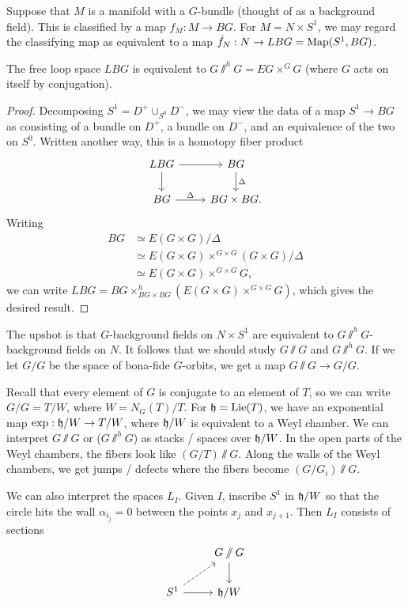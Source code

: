 Suppose that $M$ is a manifold with a $G$-bundle (thought of as a background field).
This is classified by a map $f_M: M \to BG$.
For $M = N \times S^1$, we may regard the classifying map as equivalent to a map $\hat{f}_N: N \to LBG = \operatorname{Map}(S^1, BG)$.

\begin{prop}
	The free loop space $LBG$ is equivalent to $G \sslash^h G = EG \times^G G$ (where $G$ acts on itself by conjugation).
\end{prop}

\begin{proof}
	Decomposing $S^1 = D^+ \cup_{S^0} D^-$, we may view the data of a map $S^1 \to BG$ as consisting of a bundle on $D^+$, a bundle on $D^-$, and an equivalence of the two on $S^0$.
	Written another way, this is a homotopy fiber product
	\[
		\begin{tikzcd}
			LBG \rar \dar & BG \dar["\Delta"] \\
			BG \rar["\Delta"] & BG \times BG.
		\end{tikzcd}
	\]
	Writing
	\begin{align*}
		   BG &\simeq E(G \times G) / \Delta \\
		   &\simeq E(G \times G) \times^{G \times G} (G \times G) / \Delta \\
		   &\simeq E(G \times G) \times^{G \times G} G,
	\end{align*}
	we can write $LBG = BG \times_{BG \times BG}^h (E(G \times G) \times^{G \times G} G)$, which gives the desired result.
\end{proof}

The upshot is that $G$-background fields on $N \times S^1$ are equivalent to $G \sslash^h G$-background fields on $N$.
It follows that we should study $G \sslash G$ and $G \sslash^h G$.
If we let $G / G$ be the space of bona-fide $G$-orbits, we get a map $G \sslash G \to G / G$.

Recall that every element of $G$ is conjugate to an element of $T$, so we can write $G / G = T / W$, where $W = N_G(T) / T$.
For $\mathfrak{h} = \operatorname{Lie}(T)$, we have an exponential map $\exp: \mathfrak{h} / W \to T / W$, where $\mathfrak{h} / W$ is equivalent to a Weyl chamber.
We can interpret $G \sslash G$ or ($G \sslash^h G$) as stacks / spaces over $\mathfrak{h} / W$.
In the open parts of the Weyl chambers, the fibers look like $(G / T) \sslash G$.
Along the walls of the Weyl chambers, we get jumps / defects where the fibers become $(G / G_i) \sslash G$.

We can also interpret the spaces $L_I$.
Given $I$, inscribe $S^1$ in $\mathfrak{h} / W$ so that the circle hits the wall $\alpha_{i_j} = 0$ between the points $x_j$ and $x_{j+1}$.
Then $L_I$ consists of sections
\[
	\begin{tikzcd}
		 & {G \sslash G} \dar \\
		S^1 \rar \ar[ur, dashed] & \hfr / W
	\end{tikzcd}
\]

